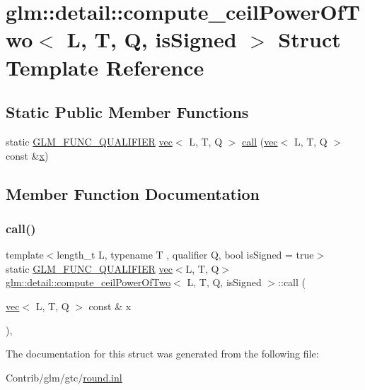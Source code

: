 \hypertarget{structglm_1_1detail_1_1compute__ceil_power_of_two}{}\section{glm\+:\+:detail\+:\+:compute\+\_\+ceil\+Power\+Of\+Two$<$ L, T, Q, is\+Signed $>$ Struct Template Reference}
\label{structglm_1_1detail_1_1compute__ceil_power_of_two}
\subsection*{Static Public Member Functions}
\begin{DoxyCompactItemize}
\item 
static \mbox{\hyperlink{setup_8hpp_a33fdea6f91c5f834105f7415e2a64407}{G\+L\+M\+\_\+\+F\+U\+N\+C\+\_\+\+Q\+U\+A\+L\+I\+F\+I\+ER}} \mbox{\hyperlink{structglm_1_1vec}{vec}}$<$ L, T, Q $>$ \mbox{\hyperlink{structglm_1_1detail_1_1compute__ceil_power_of_two_aa074d3ad43e792925268c9295c734054}{call}} (\mbox{\hyperlink{structglm_1_1vec}{vec}}$<$ L, T, Q $>$ const \&\mbox{\hyperlink{_s_d_l__opengl_8h_ad0e63d0edcdbd3d79554076bf309fd47}{x}})
\end{DoxyCompactItemize}


\subsection{Member Function Documentation}
\mbox{\label{structglm_1_1detail_1_1compute__ceil_power_of_two_aa074d3ad43e792925268c9295c734054}} 
\subsubsection{\texorpdfstring{call()}{call()}}
{\footnotesize\ttfamily template$<$length\+\_\+t L, typename T , qualifier Q, bool is\+Signed = true$>$ \\
static \mbox{\hyperlink{setup_8hpp_a33fdea6f91c5f834105f7415e2a64407}{G\+L\+M\+\_\+\+F\+U\+N\+C\+\_\+\+Q\+U\+A\+L\+I\+F\+I\+ER}} \mbox{\hyperlink{structglm_1_1vec}{vec}}$<$L, T, Q$>$ \mbox{\hyperlink{structglm_1_1detail_1_1compute__ceil_power_of_two}{glm\+::detail\+::compute\+\_\+ceil\+Power\+Of\+Two}}$<$ L, T, Q, is\+Signed $>$\+::call (\begin{DoxyParamCaption}\item[{\mbox{\hyperlink{structglm_1_1vec}{vec}}$<$ L, T, Q $>$ const \&}]{x }\end{DoxyParamCaption})\hspace{0.3cm}{\ttfamily [inline]}, {\ttfamily [static]}}



The documentation for this struct was generated from the following file\+:\begin{DoxyCompactItemize}
\item 
Contrib/glm/gtc/\mbox{\hyperlink{round_8inl}{round.\+inl}}\end{DoxyCompactItemize}
